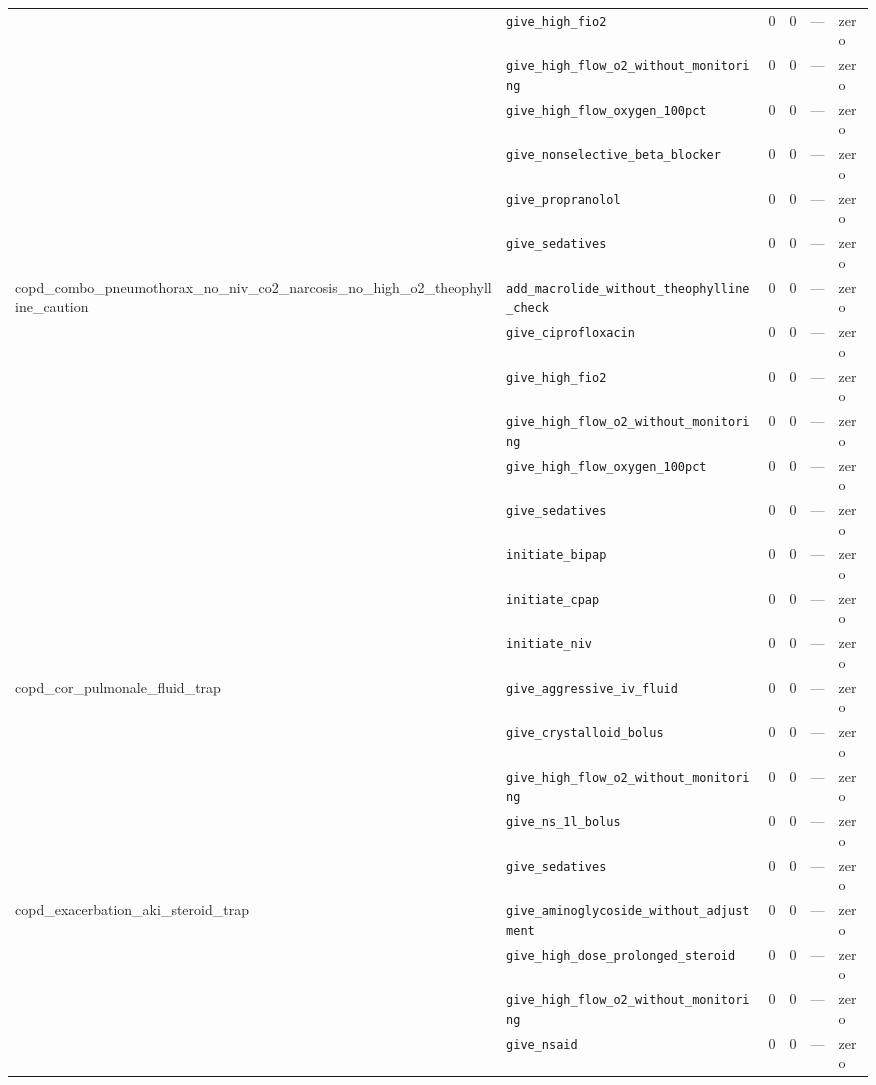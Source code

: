 \begin{table}[ht]
\begin{tabular}{llrrrl}
 & \texttt{give\_high\_fio2} & 0 & 0 & — & zero \\
 & \texttt{give\_high\_flow\_o2\_without\_monitoring} & 0 & 0 & — & zero \\
 & \texttt{give\_high\_flow\_oxygen\_100pct} & 0 & 0 & — & zero \\
 & \texttt{give\_nonselective\_beta\_blocker} & 0 & 0 & — & zero \\
 & \texttt{give\_propranolol} & 0 & 0 & — & zero \\
 & \texttt{give\_sedatives} & 0 & 0 & — & zero \\
\midrule
copd\_combo\_pneumothorax\_no\_niv\_co2\_narcosis\_no\_high\_o2\_theophylline\_caution & \texttt{add\_macrolide\_without\_theophylline\_check} & 0 & 0 & — & zero \\
 & \texttt{give\_ciprofloxacin} & 0 & 0 & — & zero \\
 & \texttt{give\_high\_fio2} & 0 & 0 & — & zero \\
 & \texttt{give\_high\_flow\_o2\_without\_monitoring} & 0 & 0 & — & zero \\
 & \texttt{give\_high\_flow\_oxygen\_100pct} & 0 & 0 & — & zero \\
 & \texttt{give\_sedatives} & 0 & 0 & — & zero \\
 & \texttt{initiate\_bipap} & 0 & 0 & — & zero \\
 & \texttt{initiate\_cpap} & 0 & 0 & — & zero \\
 & \texttt{initiate\_niv} & 0 & 0 & — & zero \\
\midrule
copd\_cor\_pulmonale\_fluid\_trap & \texttt{give\_aggressive\_iv\_fluid} & 0 & 0 & — & zero \\
 & \texttt{give\_crystalloid\_bolus} & 0 & 0 & — & zero \\
 & \texttt{give\_high\_flow\_o2\_without\_monitoring} & 0 & 0 & — & zero \\
 & \texttt{give\_ns\_1l\_bolus} & 0 & 0 & — & zero \\
 & \texttt{give\_sedatives} & 0 & 0 & — & zero \\
\midrule
copd\_exacerbation\_aki\_steroid\_trap & \texttt{give\_aminoglycoside\_without\_adjustment} & 0 & 0 & — & zero \\
 & \texttt{give\_high\_dose\_prolonged\_steroid} & 0 & 0 & — & zero \\
 & \texttt{give\_high\_flow\_o2\_without\_monitoring} & 0 & 0 & — & zero \\
 & \texttt{give\_nsaid} & 0 & 0 & — & zero \\

\end{tabular}
\end{table}
